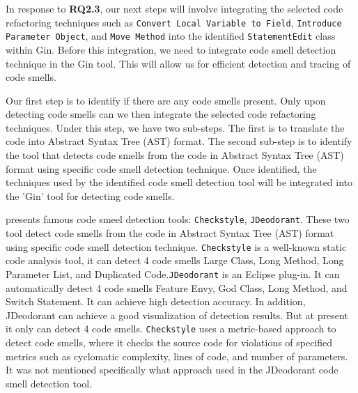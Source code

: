 
In response to \textbf{RQ2.3}, our next steps will involve integrating the selected code refactoring techniques such as \texttt{Convert Local Variable to Field}, \texttt{Introduce Parameter Object}, and \texttt{Move Method} into the identified \texttt{StatementEdit} class within Gin. Before this integration, we need to integrate code smell detection technique in the Gin tool. This will allow us for efficient detection and tracing of code smells. 

\vspace{.5em}
Our first step is to identify if there are any code smells present. Only upon detecting code smells can we then integrate the selected code refactoring techniques. Under this step, we have two sub-steps. The first is to translate the code into Abstract Syntax Tree (AST) format. The second sub-step is to identify the tool that detects code smells from the code in Abstract Syntax Tree (AST) format using specific code smell detection technique. Once identified, the techniques used by the identified code smell detection tool will be integrated into the 'Gin' tool for detecting code smells.

\vspace{.5em}
\cite{liu2017detection} presents famous code smeel detection tools: \texttt{Checkstyle}, \texttt{JDeodorant}. These two tool detect code smells from the code in Abstract Syntax Tree (AST) format using specific code smell detection technique. \texttt{Checkstyle} is a well-known static code analysis tool, it can detect 4 code smells Large Class, Long Method, Long Parameter List, and Duplicated Code.\texttt{JDeodorant} is an Eclipse plug-in\cite{DBLP:conf/wcre/TsantalisCC18}. It can automatically detect 4 code smells Feature Envy, God Class, Long Method, and Switch Statement. It can achieve high detection accuracy. In addition, JDeodorant can achieve a good visualization of detection results. But at present it only can detect 4 code smells. \texttt{Checkstyle} uses a metric-based approach to detect code smells, where it checks the source code for violations of specified metrics such as cyclomatic complexity, lines of code, and number of parameters\cite{DBLP:journals/ese/FontanaMZM16}. It was not mentioned specifically what approach used in the JDeodorant code smell detection tool.

